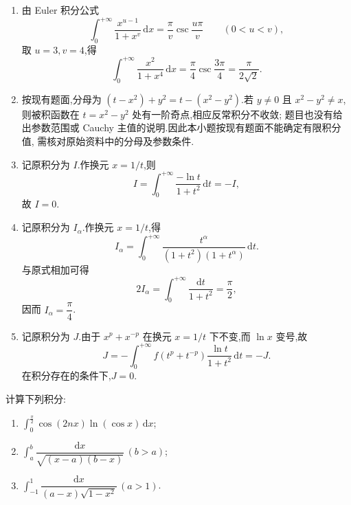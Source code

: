 \begin{solution}
  \leavevmode
  \begin{enumerate}
    \item 由 Euler 积分公式
          \[
            \displaystyle\int_0^{+\infty}\dfrac{x^{u-1}}{1+x^v}\,\mathrm{d}x
            =\dfrac{\pi}{v}\csc\dfrac{u\pi}{v}
            \qquad(0<u<v),
          \]
          取 $u=3,v=4$,得
          \[
            \displaystyle\int_0^{+\infty}\dfrac{x^2}{1+x^4}\,\mathrm{d}x
            =\dfrac{\pi}{4}\csc\dfrac{3\pi}{4}
            =\dfrac{\pi}{2\sqrt{2}}.
          \]

    \item 按现有题面,分母为 $(t-x^2)+y^2=t-(x^2-y^2)$.若 $y\neq0$ 且
          $x^2-y^2\neq x$,则被积函数在 $t=x^2-y^2$ 处有一阶奇点,相应反常积分不收敛;
          题目也没有给出参数范围或 Cauchy 主值的说明.因此本小题按现有题面不能确定有限积分值,
          需核对原始资料中的分母及参数条件.

    \item 记原积分为 $I$.作换元 $x=1/t$,则
          \[
            I=\int_0^{+\infty}\dfrac{-\ln t}{1+t^2}\,\mathrm{d}t=-I,
          \]
          故 $I=0$.

    \item 记原积分为 $I_\alpha$.作换元 $x=1/t$,得
          \[
            I_\alpha
            =\int_0^{+\infty}\dfrac{t^\alpha}{(1+t^2)(1+t^\alpha)}\,\mathrm{d}t.
          \]
          与原式相加可得
          \[
            2I_\alpha=\int_0^{+\infty}\dfrac{\mathrm{d}t}{1+t^2}=\dfrac{\pi}{2},
          \]
          因而 $I_\alpha=\dfrac{\pi}{4}$.

    \item 记原积分为 $J$.由于 $x^p+x^{-p}$ 在换元 $x=1/t$ 下不变,而
          $\ln x$ 变号,故
          \[
            J=-\int_0^{+\infty}f(t^p+t^{-p})\dfrac{\ln t}{1+t^2}\,\mathrm{d}t=-J.
          \]
          在积分存在的条件下,$J=0$.
  \end{enumerate}
\end{solution}

\begin{example}
  计算下列积分:
  \begin{enumerate}
    \item $\displaystyle\int_0^{\frac{\pi}{2}}\cos(2nx)\ln(\cos x)\,\mathrm{d}x$;
    \item $\displaystyle\int_a^b\dfrac{\mathrm{d}x}{\sqrt{(x-a)(b-x)}}\,(b>a)$;
    \item $\displaystyle\int_{-1}^{1}\dfrac{\mathrm{d}x}{(a-x)\sqrt{1-x^2}}\,(a>1)$.
  \end{enumerate}
\end{example}
\exampleblank

